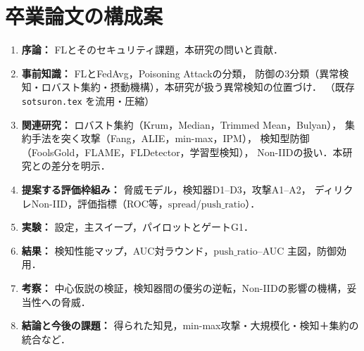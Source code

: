 \documentclass[a4j, dvipdfmx]{jsarticle}  %
\begin{document}
\section{卒業論文の構成案}

\begin{enumerate}
  \item \textbf{序論：} FLとそのセキュリティ課題，本研究の問いと貢献．
  \item \textbf{事前知識：} FLとFedAvg，Poisoning Attackの分類，
        防御の3分類（異常検知・ロバスト集約・摂動機構），本研究が扱う異常検知の位置づけ．
        （既存 \texttt{sotsuron.tex} を流用・圧縮）
  \item \textbf{関連研究：} ロバスト集約（Krum，Median，Trimmed Mean，Bulyan），
        集約手法を突く攻撃（Fang，ALIE，min-max，IPM），
        検知型防御（FoolsGold，FLAME，FLDetector，学習型検知），
        Non-IIDの扱い．本研究との差分を明示．
  \item \textbf{提案する評価枠組み：} 脅威モデル，検知器D1--D3，攻撃A1--A2，
        ディリクレNon-IID，評価指標（ROC等，$\mathrm{spread}$/$\mathrm{push\_ratio}$）．
  \item \textbf{実験：} 設定，主スイープ，パイロットとゲートG1．
  \item \textbf{結果：} 検知性能マップ，AUC対ラウンド，$\mathrm{push\_ratio}$--AUC 主図，防御効用．
  \item \textbf{考察：} 中心仮説の検証，検知器間の優劣の逆転，Non-IIDの影響の機構，妥当性への脅威．
  \item \textbf{結論と今後の課題：} 得られた知見，min-max攻撃・大規模化・検知＋集約の統合など．
\end{enumerate}
\end{document}
